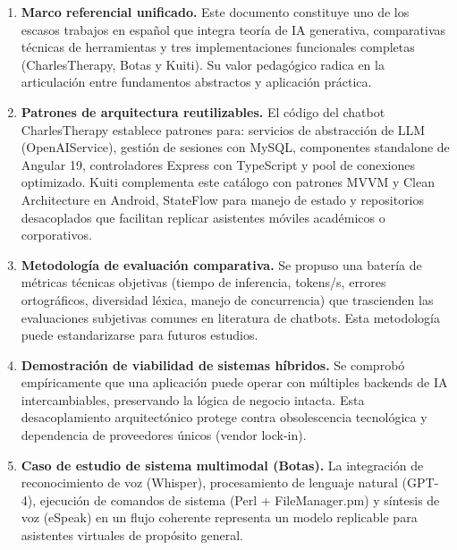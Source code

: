 \documentclass[12pt,a4paper]{report}
\numberwithin{figure}{section}
\begin{document}
\begin{enumerate}
    \item \textbf{Marco referencial unificado.}  
    Este documento constituye uno de los escasos trabajos en español que integra teoría de IA generativa, comparativas técnicas de herramientas y tres implementaciones funcionales completas (CharlesTherapy, Botas y Kuiti). Su valor pedagógico radica en la articulación entre fundamentos abstractos y aplicación práctica.

    \item \textbf{Patrones de arquitectura reutilizables.}  
    El código del chatbot CharlesTherapy establece patrones para: servicios de abstracción de LLM (OpenAIService), gestión de sesiones con MySQL, componentes standalone de Angular 19, controladores Express con TypeScript y pool de conexiones optimizado. Kuiti complementa este catálogo con patrones MVVM y Clean Architecture en Android, StateFlow para manejo de estado y repositorios desacoplados que facilitan replicar asistentes móviles académicos o corporativos.

    \item \textbf{Metodología de evaluación comparativa.}  
    Se propuso una batería de métricas técnicas objetivas (tiempo de inferencia, tokens/s, errores ortográficos, diversidad léxica, manejo de concurrencia) que trascienden las evaluaciones subjetivas comunes en literatura de chatbots. Esta metodología puede estandarizarse para futuros estudios.

    \item \textbf{Demostración de viabilidad de sistemas híbridos.}  
    Se comprobó empíricamente que una aplicación puede operar con múltiples backends de IA intercambiables, preservando la lógica de negocio intacta. Esta desacoplamiento arquitectónico protege contra obsolescencia tecnológica y dependencia de proveedores únicos (vendor lock-in).

    \item \textbf{Caso de estudio de sistema multimodal (Botas).}  
    La integración de reconocimiento de voz (Whisper), procesamiento de lenguaje natural (GPT-4), ejecución de comandos de sistema (Perl + FileManager.pm) y síntesis de voz (eSpeak) en un flujo coherente representa un modelo replicable para asistentes virtuales de propósito general.
\end{enumerate}

\vspace{1em}

\end{document}
